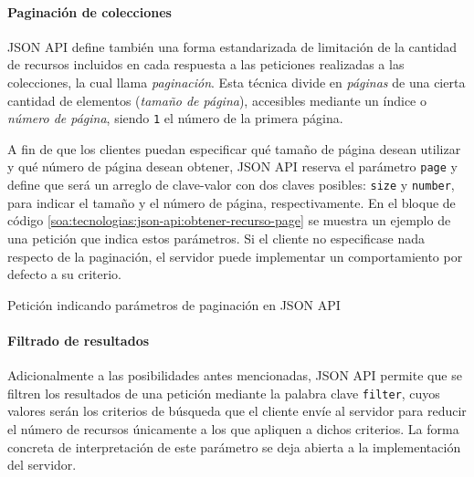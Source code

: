 \paragraph{Paginación de colecciones}

JSON API define también una forma estandarizada de limitación de la cantidad de recursos incluidos en cada respuesta a las peticiones realizadas a las colecciones, la cual llama \textit{paginación}. Esta técnica divide en \textit{páginas} de una cierta cantidad de elementos (\textit{tamaño de página}), accesibles mediante un índice o \textit{número de página}, siendo \texttt{1} el número de la primera página.

A fin de que los clientes puedan especificar qué tamaño de página desean utilizar y qué número de página desean obtener, JSON API reserva el parámetro \texttt{page} y define que será un arreglo de clave-valor con dos claves posibles: \texttt{size} y \texttt{number}, para indicar el tamaño y el número de página, respectivamente. En el bloque de código \autoref{soa:tecnologias:json-api:obtener-recurso-page} se muestra un ejemplo de una petición que indica estos parámetros. Si el cliente no especificase nada respecto de la paginación, el servidor puede implementar un comportamiento por defecto a su criterio.

\begin{listing}
  \caption{Petición indicando parámetros de paginación en JSON API}
  \label{soa:tecnologias:json-api:obtener-recurso-page}
\end{listing}

\paragraph{Filtrado de resultados}

Adicionalmente a las posibilidades antes mencionadas, JSON API permite que se filtren los resultados de una petición mediante la palabra clave \texttt{filter}, cuyos valores serán los criterios de búsqueda que el cliente envíe al servidor para reducir el número de recursos únicamente a los que apliquen a dichos criterios. La forma concreta de interpretación de este parámetro se deja abierta a la implementación del servidor.
